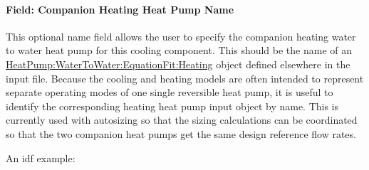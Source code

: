 \paragraph{Field: Companion Heating Heat Pump Name}\label{field-heating-companion-name}

This optional name field allows the user to specify the companion heating water to water heat pump for this cooling component. This should be the name of an \hyperref[heatpumpwatertowaterequationfitheating]{HeatPump:WaterToWater:EquationFit:Heating} object defined elsewhere in the input file. Because the cooling and heating models are often intended to represent separate operating modes of one single reversible heat pump, it is useful to identify the corresponding heating heat pump input object by name. This is currently used with autosizing so that the sizing calculations can be coordinated so that the two companion heat pumps get the same design reference flow rates.

An idf example:

